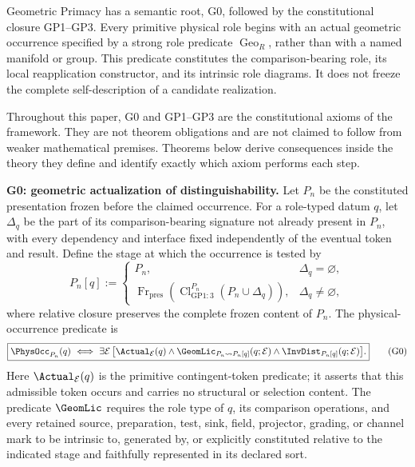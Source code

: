 \documentclass[12pt,a4paper]{article}
\begin{document}
\begin{mdframed}[style=postulatebox,nobreak=false]
\begin{principle}
\label{p2:prin:geometric-primacy-minimal-constitution}
Geometric Primacy has a semantic root, G0, followed by the constitutional
closure GP1--GP3.  Every primitive physical role begins
with an actual geometric occurrence specified by a strong role predicate
\(\operatorname{Geo}_R\), rather than with a named manifold or group.  This
predicate constitutes the comparison-bearing role, its local reapplication
constructor, and its intrinsic role diagrams.  It does not freeze the complete
self-description of a candidate realization.

Throughout this paper, G0 and GP1--GP3 are the constitutional axioms of the
framework.  They are not theorem obligations and are not claimed to follow
from weaker mathematical premises.  Theorems below derive consequences inside
the theory they define and identify exactly which axiom performs each step.

\medskip
\noindent\textbf{G0: geometric actualization of distinguishability.}
Let \(P_n\) be the constituted presentation frozen before the claimed
occurrence.  For a role-typed datum \(q\), let \(\Delta_q\) be the part of its
comparison-bearing signature not already present in \(P_n\), with every
dependency and interface fixed independently of the eventual token and
result.  Define the stage at which the occurrence is tested by
\[
 P_n[q]:=
 \begin{cases}
   P_n,
     & \Delta_q=\varnothing,\\[2pt]
   \operatorname{Fr}_{\mathrm{pres}}
   \!\left(\operatorname{Cl}^{P_n}_{\mathrm{GP1:3}}
   (P_n\cup\Delta_q)\right),
     & \Delta_q\ne\varnothing,
 \end{cases}
\]
where relative closure preserves the complete frozen content of \(P_n\).
The physical-occurrence predicate is
\[
\boxed{
 \PhysOcc_{P_n}(q)
 \ \Longleftrightarrow\
 \exists\mathcal E\,
 \bigl[
   \Actual_{\mathcal E}(q)
   \wedge
   \GeomLic_{P_n\rightsquigarrow P_n[q]}(q;\mathcal E)
   \wedge
   \InvDist_{P_n[q]}(q;\mathcal E)
 \bigr].}
\tag{\ensuremath{\mathrm{G0}}}
\]
Here \(\Actual_{\mathcal E}(q)\) is the primitive contingent-token predicate;
it asserts that this admissible token occurs and carries no structural or
selection content.  The predicate \(\GeomLic\) requires the role type of
\(q\), its comparison operations, and every retained source, preparation,
test, sink, field, projector, grading, or channel mark to be intrinsic to,
generated by, or explicitly constituted relative to the indicated stage and
faithfully represented in its declared sort.


\end{principle}
\end{mdframed}
\end{document}
